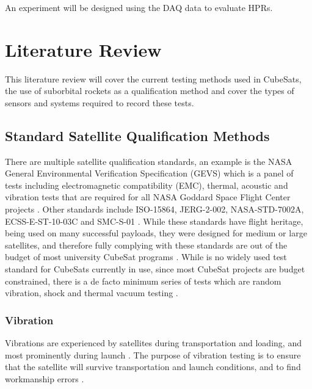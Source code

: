 \documentclass{report}
\begin{document}
An experiment will be designed using the DAQ data to evaluate HPRs.

\chapter{Literature Review}

This literature review will cover the current testing methods used in CubeSats, the use of suborbital rockets as a qualification method and cover the types of sensors and systems required to record these tests.

\section{Standard Satellite Qualification Methods}
There are multiple satellite qualification standards, an example is the NASA General Environmental Verification Specification (GEVS) which is a panel of tests including electromagnetic compatibility (EMC), thermal, acoustic and vibration tests that are required for all NASA Goddard Space Flight Center projects \cite{nasa-gevs}. Other standards include ISO-15864, JERG-2-002, NASA-STD-7002A, ECSS-E-ST-10-03C and SMC-S-01 \cite{cho2012overview}. While these standards have flight heritage, being used on many successful payloads, they were designed for medium or large satellites, and therefore fully complying with these standards are out of the budget of most university CubeSat programs \cite{cho2012overview}. While is no widely used test standard for CubeSats currently in use, since most CubeSat projects are budget constrained, there is a de facto minimum series of tests which are random vibration, shock and thermal vacuum testing \cite{welle2020overview}.


\subsection{Vibration}
Vibrations are experienced by satellites during transportation and loading, and most prominently during launch \cite{brown_elements_2002}. The purpose of vibration testing is to ensure that the satellite will survive transportation and launch conditions, and to find workmanship errors \cite{brown_elements_2002,gordon2015benefits}.
\end{document}
